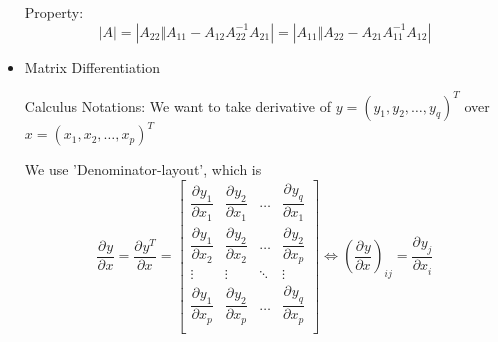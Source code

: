 \begin{itemize}[topsep=6pt,itemsep=4pt]
        Property:
        \begin{equation}
            |A|= |A_{22}\Vert A_{11}-A_{12}A_{22}^{-1}A_{21}|=|A_{11}\Vert A_{22}-A_{21}A_{11}^{-1}A_{12}|
        \end{equation}
        
        

            
                       
        \item Matrix Differentiation
        
        Calculus Notations: We want to take derivative of $ y=(y_1,y_2,\ldots,y_q)^T $ over $ x=(x_1,x_2,\ldots,x_p)^T $
        
        We use 'Denominator-layout', which is
        \begin{equation}\label{EqaMatrixDifferential}
            \dfrac{\partial^{}y }{\partial ^{}x}=\dfrac{\partial^{} y^T}{\partial x^{}} =
            \begin{bmatrix}
            \dfrac{\partial^{} y_1}{\partial x_1 ^{}}&\dfrac{\partial^{} y_2}{\partial x_1 ^{}}&\ldots&\dfrac{\partial^{} y_q}{\partial x_1 ^{}}\\
            \dfrac{\partial^{} y_1}{\partial x_2 ^{}}&\dfrac{\partial^{} y_2}{\partial x_2 ^{}}&\ldots&\dfrac{\partial^{} y_2}{\partial x_p ^{}}\\
            \vdots&\vdots&\ddots&\vdots\\
            \dfrac{\partial^{} y_1}{\partial x_p ^{}}&\dfrac{\partial^{} y_2}{\partial x_p ^{}}&\ldots&\dfrac{\partial^{} y_q}{\partial x_p ^{}}\\
            \end{bmatrix}\Leftrightarrow \left(\dfrac{\partial^{} y}{\partial x^{}}\right)_{ij}=\dfrac{\partial^{} y_j}{\partial x_i^{}}
        \end{equation}
        

\end{itemize}
